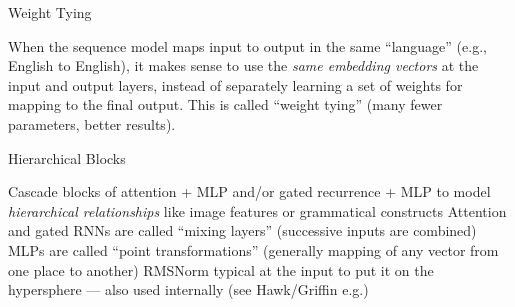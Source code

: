 \begin{slide}[\slideopts]{Weight Tying}

  When the sequence model maps input to output in the same ``language'' (e.g., English to English),
  it makes sense to use the \emph{same embedding vectors} at the input and output layers, instead
  of separately learning a set of weights for mapping to the final output.
  This is called ``weight tying'' (many fewer parameters, better results).

\end{slide}

\begin{slide}[\slideopts]{Hierarchical Blocks}
\begin{itemize}
  \mpitem Cascade blocks of attention + MLP and/or gated recurrence + MLP to model \emph{hierarchical relationships} like image features or grammatical constructs
  \mpitem Attention and gated RNNs are called ``mixing layers'' (successive inputs are combined)
  \mpitem MLPs are called ``point transformations'' (generally mapping of any vector from one place to another)
  \mpitem RMSNorm typical at the input to put it on the hypersphere --- also used internally (see Hawk/Griffin e.g.)
\end{itemize}
\end{slide}








